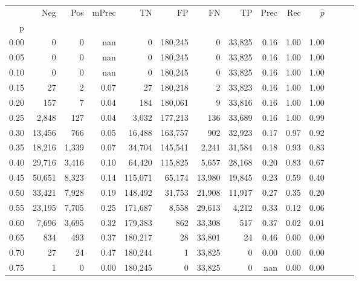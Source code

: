 \begin{tabular}{rrrrrrrrrrrrrr}
\toprule
{} &     Neg &    Pos & mPrec &       TN &       FP &      FN &      TP &  Prec &   Rec & $\hat{p}$ \\
p    &         &        &       &          &          &         &         &       &       &           \\
\midrule
0.00 &       0 &      0 &   nan &        0 &  180,245 &       0 &  33,825 &  0.16 &  1.00 &      1.00 \\
0.05 &       0 &      0 &   nan &        0 &  180,245 &       0 &  33,825 &  0.16 &  1.00 &      1.00 \\
0.10 &       0 &      0 &   nan &        0 &  180,245 &       0 &  33,825 &  0.16 &  1.00 &      1.00 \\
0.15 &      27 &      2 &  0.07 &       27 &  180,218 &       2 &  33,823 &  0.16 &  1.00 &      1.00 \\
0.20 &     157 &      7 &  0.04 &      184 &  180,061 &       9 &  33,816 &  0.16 &  1.00 &      1.00 \\
0.25 &   2,848 &    127 &  0.04 &    3,032 &  177,213 &     136 &  33,689 &  0.16 &  1.00 &      0.99 \\
0.30 &  13,456 &    766 &  0.05 &   16,488 &  163,757 &     902 &  32,923 &  0.17 &  0.97 &      0.92 \\
0.35 &  18,216 &  1,339 &  0.07 &   34,704 &  145,541 &   2,241 &  31,584 &  0.18 &  0.93 &      0.83 \\
0.40 &  29,716 &  3,416 &  0.10 &   64,420 &  115,825 &   5,657 &  28,168 &  0.20 &  0.83 &      0.67 \\
0.45 &  50,651 &  8,323 &  0.14 &  115,071 &   65,174 &  13,980 &  19,845 &  0.23 &  0.59 &      0.40 \\
0.50 &  33,421 &  7,928 &  0.19 &  148,492 &   31,753 &  21,908 &  11,917 &  0.27 &  0.35 &      0.20 \\
0.55 &  23,195 &  7,705 &  0.25 &  171,687 &    8,558 &  29,613 &   4,212 &  0.33 &  0.12 &      0.06 \\
0.60 &   7,696 &  3,695 &  0.32 &  179,383 &      862 &  33,308 &     517 &  0.37 &  0.02 &      0.01 \\
0.65 &     834 &    493 &  0.37 &  180,217 &       28 &  33,801 &      24 &  0.46 &  0.00 &      0.00 \\
0.70 &      27 &     24 &  0.47 &  180,244 &        1 &  33,825 &       0 &  0.00 &  0.00 &      0.00 \\
0.75 &       1 &      0 &  0.00 &  180,245 &        0 &  33,825 &       0 &   nan &  0.00 &      0.00 \\

\end{tabular}
